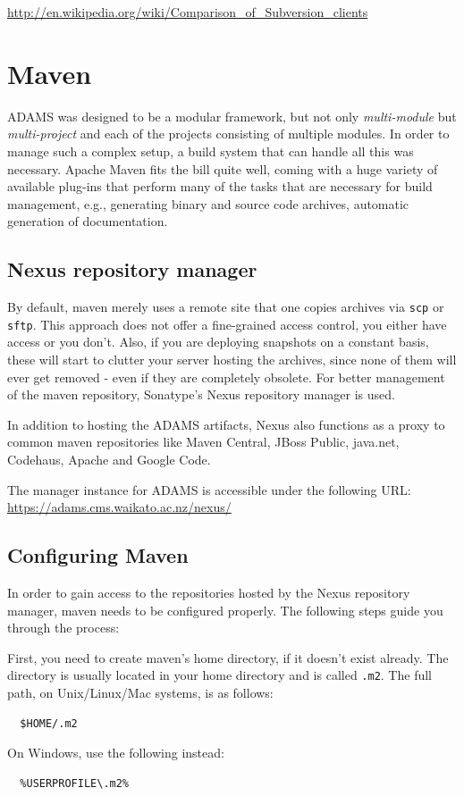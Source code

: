 \url{http://en.wikipedia.org/wiki/Comparison_of_Subversion_clients}{}

\section{Maven}
ADAMS was designed to be a modular framework, but not only \textit{multi-module}
but \textit{multi-project} and each of the projects consisting of multiple
modules. In order to manage such a complex setup, a build system that can handle
all this was necessary. Apache Maven \cite{maven} fits the bill quite well,
coming with a huge variety of available plug-ins that perform many of the tasks
that are necessary for build management, e.g., generating binary and source code
archives, automatic generation of documentation.

\subsection{Nexus repository manager}
By default, maven merely uses a remote site that one copies archives via
\texttt{scp} or \texttt{sftp}. This approach does not offer a
fine-grained access control, you either have access or you don't. Also, if you
are deploying snapshots on a constant basis, these will start to clutter your
server hosting the archives, since none of them will ever get removed - even
if they are completely obsolete. For better management of the maven repository,
Sonatype's Nexus repository manager \cite{nexus} is used.

In addition to hosting the ADAMS artifacts, Nexus also functions as a proxy to
common maven repositories like Maven Central, JBoss Public, java.net, Codehaus,
Apache and Google Code.

The manager instance for ADAMS is accessible under the following URL:
\url{https://adams.cms.waikato.ac.nz/nexus/}{}

\subsection{Configuring Maven}
In order to gain access to the repositories hosted by the Nexus repository
manager, maven needs to be configured properly. The following steps guide you
through the process:

First, you need to create maven's home directory, if it doesn't exist already.
The directory is usually located in your home directory and is called
\texttt{.m2}. The full path, on Unix/Linux/Mac systems, is as follows:
\begin{verbatim}
  $HOME/.m2
\end{verbatim}
On Windows, use the following instead:
\begin{verbatim}
  %USERPROFILE\.m2%
\end{verbatim}

